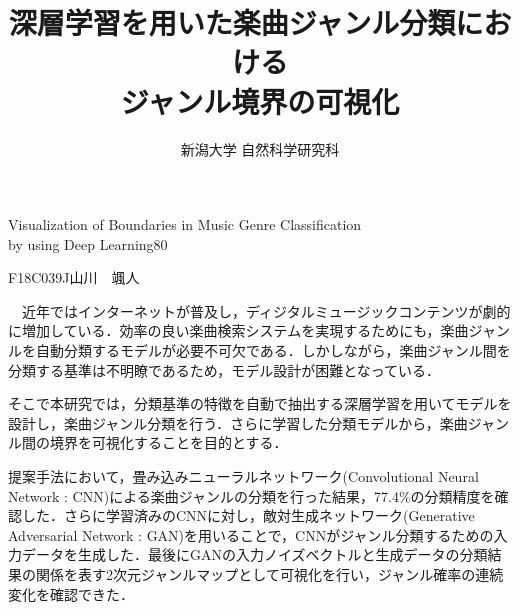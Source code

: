 \documentclass[a4paper,11pt]{jreport}
\begin{document}

\begin{toppage}

\title{深層学習を用いた楽曲ジャンル分類における\\ジャンル境界の可視化}{Visualization of Boundaries in Music Genre Classification \\ by using Deep Learning}{80}
\author{新潟大学 自然科学研究科}{F18C039J}{山川　颯人}


\end{toppage}

\begin{jpnabstract}
　近年ではインターネットが普及し，ディジタルミュージックコンテンツが劇的に増加している．効率の良い楽曲検索システムを実現するためにも，楽曲ジャンルを自動分類するモデルが必要不可欠である．しかしながら，楽曲ジャンル間を分類する基準は不明瞭であるため，モデル設計が困難となっている．


そこで本研究では，分類基準の特徴を自動で抽出する深層学習を用いてモデルを設計し，楽曲ジャンル分類を行う．さらに学習した分類モデルから，楽曲ジャンル間の境界を可視化することを目的とする．


提案手法において，畳み込みニューラルネットワーク(Convolutional Neural Network : CNN)による楽曲ジャンルの分類を行った結果，77.4\%の分類精度を確認した．さらに学習済みのCNNに対し，敵対生成ネットワーク(Generative Adversarial Network : GAN)を用いることで，CNNがジャンル分類するための入力データを生成した．最後にGANの入力ノイズベクトルと生成データの分類結果の関係を表す2次元ジャンルマップとして可視化を行い，ジャンル確率の連続変化を確認できた．

\end{jpnabstract}
\end{document}
